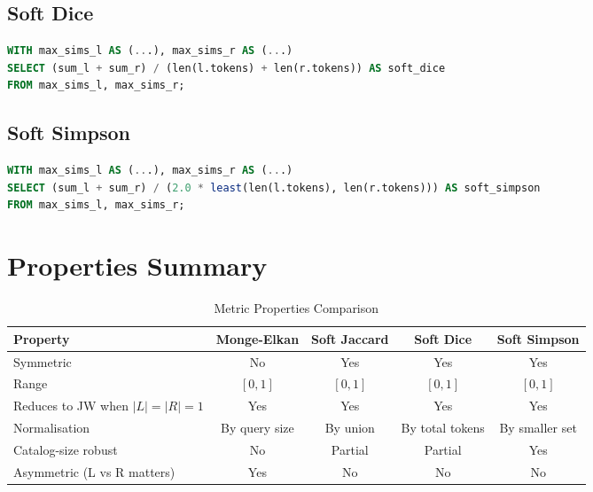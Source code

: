 \subsection{Soft Dice}
\begin{lstlisting}[language=SQL, caption={Soft Dice SQL}]
WITH max_sims_l AS (...), max_sims_r AS (...)
SELECT (sum_l + sum_r) / (len(l.tokens) + len(r.tokens)) AS soft_dice
FROM max_sims_l, max_sims_r;
\end{lstlisting}

\subsection{Soft Simpson}
\begin{lstlisting}[language=SQL, caption={Soft Simpson SQL}]
WITH max_sims_l AS (...), max_sims_r AS (...)
SELECT (sum_l + sum_r) / (2.0 * least(len(l.tokens), len(r.tokens))) AS soft_simpson
FROM max_sims_l, max_sims_r;
\end{lstlisting}

\section{Properties Summary}

\begin{table}[htbp]
	\centering
	\caption{Metric Properties Comparison}
	\label{tab:metric_properties}
	\begin{tabular}{lcccc}
		\toprule
		\textbf{Property}              & Monge-Elkan   & Soft Jaccard & Soft Dice       & Soft Simpson   \\
		\midrule
		Symmetric                      & No            & Yes          & Yes             & Yes            \\
		Range                          & $[0,1]$       & $[0,1]$      & $[0,1]$         & $[0,1]$        \\
		Reduces to JW when $|L|=|R|=1$ & Yes           & Yes          & Yes             & Yes            \\
		Normalisation                  & By query size & By union     & By total tokens & By smaller set \\
		Catalog-size robust            & No            & Partial      & Partial         & Yes            \\
		Asymmetric (L vs R matters)    & Yes           & No           & No              & No             \\
		\bottomrule
	\end{tabular}
\end{table}

